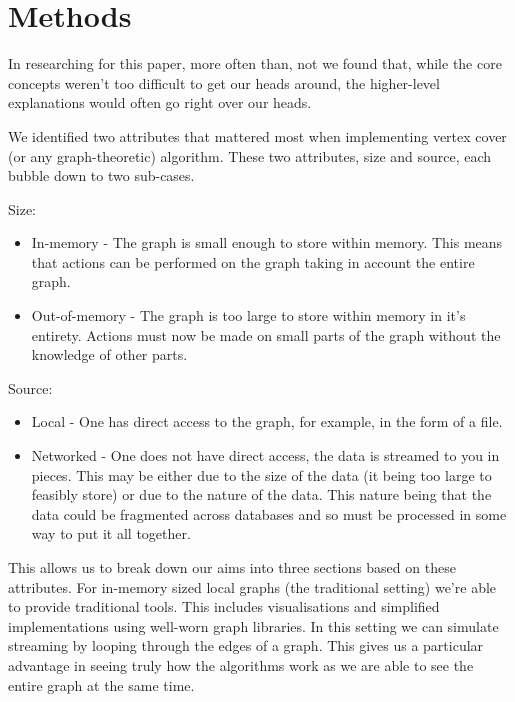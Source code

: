 \section{Methods}

In researching for this paper, more often than, not we found that, while
the core concepts weren't too difficult to get our heads around, the
higher-level explanations would often go right over our heads.

We identified two attributes that mattered most when implementing vertex
cover (or any graph-theoretic) algorithm. These two attributes, size and
source, each bubble down to two sub-cases.

Size:

\begin{itemize}
    \item
          In-memory - The graph is small enough to store within memory. This
          means that actions can be performed on the graph taking in account the
          entire graph.
    \item
          Out-of-memory - The graph is too large to store within memory in it's
          entirety. Actions must now be made on small parts of the graph without
          the knowledge of other parts.
\end{itemize}

Source:

\begin{itemize}
    \item
          Local - One has direct access to the graph, for example, in the form
          of a file.
    \item
          Networked - One does not have direct access, the data is streamed to
          you in pieces. This may be either due to the size of the data (it
          being too large to feasibly store) or due to the nature of the data.
          This nature being that the data could be fragmented across databases
          and so must be processed in some way to put it all together.
\end{itemize}

This allows us to break down our aims into three sections based on these
attributes. For in-memory sized local graphs (the traditional setting)
we're able to provide traditional tools. This includes visualisations
and simplified implementations using well-worn graph libraries. In this
setting we can simulate streaming by looping through the edges of a
graph. This gives us a particular advantage in seeing truly how the
algorithms work as we are able to see the entire graph at the same time.

